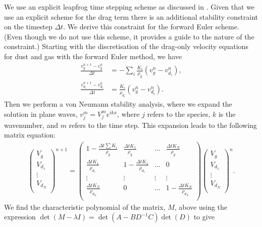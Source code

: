 \documentclass[fleqn,usenatbib]{mnras}
\begin{document}
We use an explicit leapfrog time stepping scheme as discussed in
\citet{Price2018PASA...35...31P}. Given that we use an explicit scheme for the
drag term there is an additional stability constraint on the timestep \(\Delta
t\). We derive this constraint for the forward Euler scheme. (Even though we do
not use this scheme, it provides a guide to the nature of the constraint.)
Starting with the discretisation of the drag-only velocity equations for dust
and gas with the forward Euler method, we have
%
\begin{align}
   \frac{v_g^{n+1} - v_g^n}{\Delta t} &= - \sum_i \frac{K_i}{\rho_g} \left(v_g^n - v_{d_i}^n\right), \\
   \frac{v_{d_i}^{n+1} - v_{d_i}^n}{\Delta t} &= \frac{K_i}{\rho_{d_i}} \left(v_g^n - v_{d_i}^n\right).
\end{align}
%
Then we perform a von Neumann stability analysis, where we expand the solution
in plane waves, \(v_j^m = V_j^m e^{i k x}\), where \(j\) refers to the species,
\(k\) is the wavenumber, and \(m\) refers to the time step. This expansion leads
to the following matrix equation:
%
\begin{align}
   \begin{pmatrix}
      V_g \\ V_{d_1} \\ \vdots \\ V_{d_N} \\
   \end{pmatrix}^{n+1} =
   \begin{pmatrix}
      1 - \frac{\Delta t \sum K_i}{\rho_g} & \frac{\Delta t K_1}{\rho_g} & \dots & \frac{\Delta t K_N}{\rho_g} \\
      \frac{\Delta t K_1}{\rho_{d_1}} & 1 - \frac{\Delta t K_1}{\rho_{d_1}} & \dots & 0 \\
      \vdots & \vdots & \vdots & \vdots \\
      \frac{\Delta t K_N}{\rho_{d_N}} & 0 & \dots & 1 - \frac{\Delta t K_N}{\rho_{d_N}} \\
   \end{pmatrix}
   \begin{pmatrix}
      V_g \\ V_{d_1} \\ \vdots \\ V_{d_N} \\
   \end{pmatrix}^{n}.
\end{align}
%
We find the characteristic polynomial of the matrix, \(M\), above using the
expression \(\det(M - \lambda I) = \det(A - B D^{-1} C) \det(D)\) to give
\end{document}
